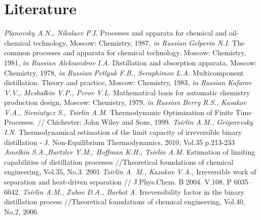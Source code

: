 \documentclass[12pt]{article}
\begin{document}
\section*{Literature}
\begin{enumerate}
{\it Planovsky A.N., Nikolaev P.I.} Processes and apparata for chemical and oil-chemical technology, Moscow: Chemistry, 1987, \textit{in Russian}
{\it Gelperin N.I.} The common processes and apparata for chemical technology, Moscow: Chemistry, 1981, \textit{in Russian}
{\it Aleksandrov I.A.} Distillation and absorption apparata, Moscow: Chemistry, 1978, \textit{in Russian}
{\it Petlyuk F.B., Seraphimov L.A.} Multicomponent distillation. Theory and practice, Moscow: Chemistry, 1983, \textit{in Russian}
{\it Kafarov V.V., Meshalkin V.P., Perov V.L.} Mathematical basis for automatic chemistry production design, Moscow: Chemistry, 1979, \textit{in Russian}
{\it Berry R.S., Kasakov V.A., Sieniutycz S., Tsirlin A.M.} Thermodynamic Optimization of Finite Time Processes. // 
Chichester: John Wiley and Sons, 1999.
{\it Tsirlin A.M., Grigorevsky I.N.} Thermodynamical estimation of the limit capacity of irreversible binary distillation -  J. Non-Equilibrium Thermodynamics, 2010, Vol.35 p.213-233
{\it Amelkin S.A.,Burtzler Y.M., Hoffman K.H., Tsirlin A.M.} Estimation of limiting capabilities of distillation processes //Theoretical foundations of chemical engineering, Vol.35, No.3. 2001
{\it Tsirlin A. M., Kazakov V.A.,} Irreversible work of separation and heat-driven separation // J.Phys.Chem. B 2004. V.108. P 6035--6042.
{\it Tsirlin A.M., Zubov D.A., Barbot A.} Irreversibility factor in the binary distillation process //Theoretical foundations of chemical engineering, Vol.40, No.2, 2006.
\end{enumerate}
\end{document}
